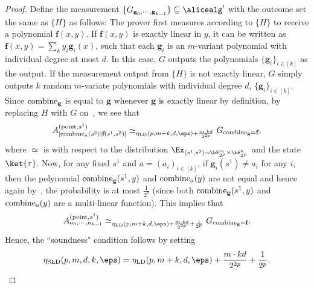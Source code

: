 \begin{proof}
	Define the measurement $\{G_{\textbf{g}_0, \cdots, \textbf{g}_{k-1}} \} \subseteq \alicealg'$ with the outcome set the same as $\{H\}$ as follows: The prover first measures according to $\{H\}$ to receive a polynomial $\textbf{f}(x,y)$. If $\textbf{f}(x,y)$ is exactly linear in $y$, it can be written as $\textbf{f}(x,y) = \sum_{k} y_i \textbf{g}_i(x)$, such that each $\textbf{g}_i$ is an $m$-variant polynomial with individual degree at most $d$. In this case, $G$ outputs the polynomials $\{\textbf{g}_i\}_{i \in [k]}$ as the output. If the measurement output from $\{H\}$ is not exactly linear, $G$ simply outputs $k$ random $m$-variate polynomials with individual degree $d$,  $\{\textbf{g}_i\}_{i \in [k]}$. Since $\text{combine}_{\textbf{g}}$ is equal to $\textbf{g}$ whenever $\textbf{g}$ is exactly linear by definition, by replacing $H$ with $G$ on~, we see that 
	\begin{equation} \label{eq:sldt-2}
	 A^{(\text{point}, s^1)}_{[\combinefun_{a}(s^2)| \textbf{f}(s^1, s^2)]} \simeq_{\mathbf{\eta}_{\text{LD}}(p,m+k,d,\eps) +  \frac{m \cdot k d}{2^{2p}}}  G_{\combinefun_{\textbf{g}} =  \textbf{f}},
	\end{equation}
	where $\simeq$ is with respect to the distribution $\Ex_{(s^1, s^2) \sim \bF_{2^p}^m \times \bF_{2^p}^k}$ and the state $\ket{\tau}$. Now, for any fixed $s^1$ and $a = (a_i)_{i \in [k]}$, if $\textbf{g}_i(s^1) \neq a_i$ for any $i$, then the polynomial $\text{combine}_{\textbf{g}}(s^1,y)$ and $\text{combine}_{a}(y)$ are not equal and hence again by~, the probability is at most $\frac{1}{2^p}$ (since both $\text{combine}_{\textbf{g}}(s^1,y)$ and $\text{combine}_{a}(y)$ are a multi-linear function). This implies that 
	\begin{equation*}
		A^{(\text{point}, s^1)}_{a_0, \cdots, a_{k-1}} \simeq_{\mathbf{\eta}_{\text{LD}}(p,m+k,d,\eps) +  \frac{m \cdot k d}{2^{2p}} + \frac{1}{2^p} }  G_{\combinefun_{\textbf{g}} =  \textbf{f}}.
	\end{equation*}
	Hence, the ``soundness" condition follows by setting 
	\begin{equation*}
		\mathbf{\eta}_{\text{SLD}}(p,m,d,k, \eps) = \eta_{\text{LD}}(p,m+k,d,\eps) +  \frac{m \cdot k d}{2^{2p}} + \frac{1}{2^p}.
	\end{equation*}

\end{proof}
